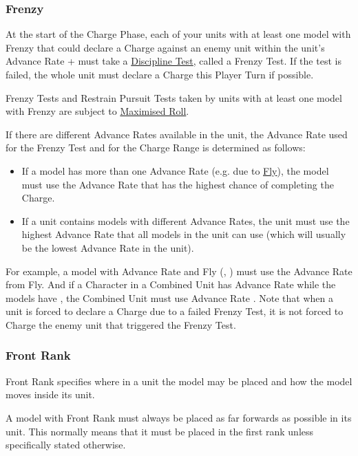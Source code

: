 \subsubsection{Frenzy}
\idx[main=y]{\frenzy}\label{frenzy}

At the start of the Charge Phase, each of your units with at least one model with Frenzy that could declare a Charge against an enemy unit within the unit's Advance Rate + must take a \hyperref[discipline_tests]{Discipline Test}, called a Frenzy Test. If the test is failed, the whole unit must declare a Charge this Player Turn if possible.

Frenzy Tests and Restrain Pursuit Tests taken by units with at least one model with Frenzy are subject to \hyperref[maximised_roll]{Maximised Roll}.

If there are different Advance Rates available in the unit, the Advance Rate used for the Frenzy Test and for the Charge Range is determined as follows:

\begin{itemize}
\item If a model has more than one Advance Rate (e.g. due to \hyperref[fly]{Fly}), the model must use the Advance Rate that has the highest chance of completing the Charge.
\item If a unit contains models with different Advance Rates, the unit must use the highest Advance Rate that all models in the unit can use (which will usually be the lowest Advance Rate in the unit).
\end{itemize}
For example, a model with Advance Rate  and Fly (, ) must use the Advance Rate from Fly. And if a Character in a Combined Unit has Advance Rate  while the \rnf{} models have , the Combined Unit must use Advance Rate . Note that when a unit is forced to declare a Charge due to a failed Frenzy Test, it is not forced to Charge the enemy unit that triggered the Frenzy Test.

\subsubsection{Front Rank}
\idx[main=y]{\frontrank}\label{front_rank}

Front Rank specifies where in a unit the model may be placed and how the model moves inside its unit.

A model with Front Rank must always be placed as far forwards as possible in its unit. This normally means that it must be placed in the first rank unless specifically stated otherwise.

